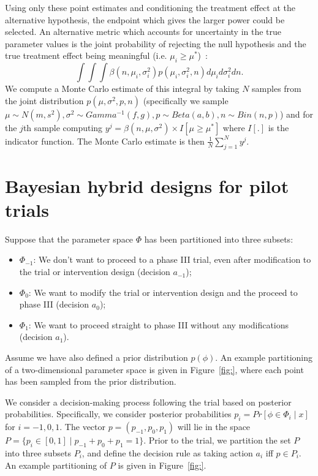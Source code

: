 \documentclass{article} %
\begin{document}
Using only these point estimates and conditioning the treatment effect at the alternative hypothesis, the endpoint which gives the larger power could be selected. An alternative metric which accounts for uncertainty in the true parameter values is the joint probability of rejecting the null hypothesis and the true treatment effect being meaningful (i.e. $\mu_{i} \geq \mu^{*}$)~\cite{OHagan2005}:
\begin{equation}
\int \int \int \beta(n, \mu_{i}, \sigma^{2}_{i})p(\mu_{i}, \sigma^{2}_{i}, n) d\mu_{i} d\sigma^{2}_{i} dn.
\end{equation}
We compute a Monte Carlo estimate of this integral by taking $N$ samples from the joint distribution $p(\mu, \sigma^{2}, p, n)$ (specifically we sample $\mu \sim N(m, s^{2}), \sigma^{2} \sim Gamma^{-1}(f, g), p \sim Beta(a, b), n \sim Bin(n, p)$) and for the $j$th sample computing $y^{j} = \beta(n, \mu, \sigma^{2}) \times I[\mu \geq \mu^{*}]$ where $I[.]$ is the indicator function. The Monte Carlo estimate is then $\frac{1}{N} \sum_{j=1}^{N} y^{j}$.

\section{Bayesian hybrid designs for pilot trials}

Suppose that the parameter space $\Phi$ has been partitioned into three subsets:
\begin{itemize}
\item $\Phi_{-1}$: We don't want to proceed to a phase III trial, even after modification to the trial or intervention design (decision $a_{-1}$);
\item $\Phi_{0}$: We want to modify the trial or intervention design and the proceed to phase III (decision $a_{0}$);
\item $\Phi_{1}$: We want to proceed straight to phase III without any modifications (decision $a_{1}$).
\end{itemize} 
Assume we have also defined a prior distribution $p(\phi)$. An example partitioning of a two-dimensional parameter space is given in Figure~\ref{fig:}, where each point has been sampled from the prior distribution.

We consider a decision-making process following the trial based on posterior probabilities. Specifically, we consider posterior probabilities $p_{i} = Pr[\phi \in \Phi_{i} \mid x]$ for $i=-1,0,1$. The vector $p = (p_{-1}, p_{0}, p_{1})$ will lie in the space $P = \{ p_{i} \in [0,1] \mid p_{-1} + p_{0} + p_{1} = 1 \}$. Prior to the trial, we partition the set $P$ into three subsets $P_{i}$, and define the decision rule as taking action $a_{i}$ iff $p \in P_{i}$. An example partitioning of $P$ is given in Figure~\ref{fig:}.
\end{document}
